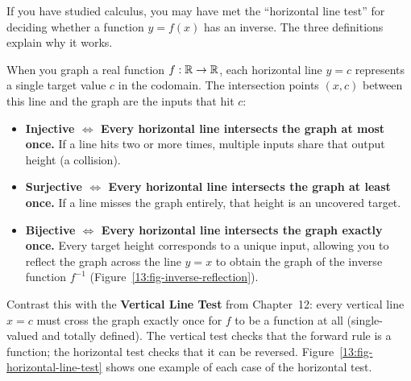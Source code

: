 If you have studied calculus, you may have met the ``horizontal line test'' for deciding whether a function $y = f(x)$ has an inverse. The three definitions explain why it works.

When you graph a real function $f: \mathbb{R} \to \mathbb{R}$, each horizontal line $y = c$ represents a single target value $c$ in the codomain. The intersection points $(x, c)$ between this line and the graph are the inputs that hit $c$:
\begin{itemize}
\item \textbf{Injective $\iff$ Every horizontal line intersects the graph at most once.} If a line hits two or more times, multiple inputs share that output height (a collision).
\item \textbf{Surjective $\iff$ Every horizontal line intersects the graph at least once.} If a line misses the graph entirely, that height is an uncovered target.
\item \textbf{Bijective $\iff$ Every horizontal line intersects the graph exactly once.} Every target height corresponds to a unique input, allowing you to reflect the graph across the line $y = x$ to obtain the graph of the inverse function $f^{-1}$ (Figure~\ref{13:fig-inverse-reflection}).
\end{itemize}
Contrast this with the \textbf{Vertical Line Test} from Chapter~12: every vertical line $x = c$ must cross the graph exactly once for $f$ to be a function at all (single-valued and totally defined). The vertical test checks that the forward rule is a function; the horizontal test checks that it can be reversed. Figure~\ref{13:fig-horizontal-line-test} shows one example of each case of the horizontal test.


